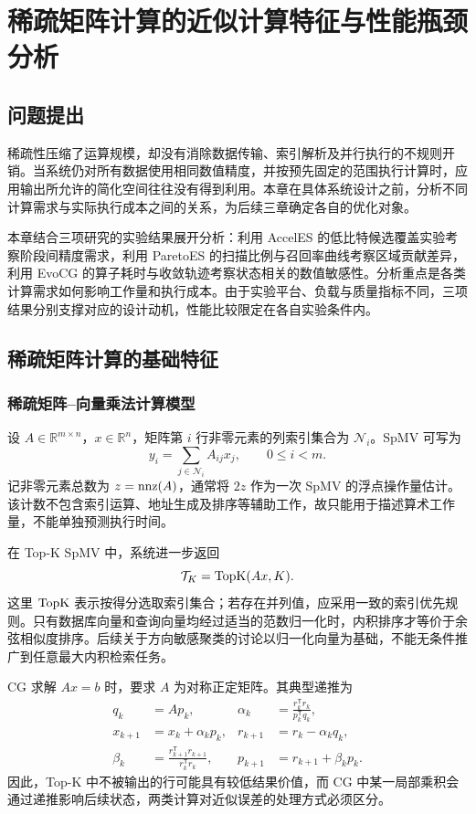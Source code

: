 \chapter{稀疏矩阵计算的近似计算特征与性能瓶颈分析}\label{chap:analysis}
\section{问题提出}
稀疏性压缩了运算规模，却没有消除数据传输、索引解析及并行执行的不规则开销。当系统仍对所有数据使用相同数值精度，并按预先固定的范围执行计算时，应用输出所允许的简化空间往往没有得到利用。本章在具体系统设计之前，分析不同计算需求与实际执行成本之间的关系，为后续三章确定各自的优化对象。

本章结合三项研究的实验结果展开分析：利用 AccelES 的低比特候选覆盖实验考察阶段间精度需求，利用 ParetoES 的扫描比例与召回率曲线考察区域贡献差异，利用 EvoCG 的算子耗时与收敛轨迹考察状态相关的数值敏感性。分析重点是各类计算需求如何影响工作量和执行成本。由于实验平台、负载与质量指标不同，三项结果分别支撑对应的设计动机，性能比较限定在各自实验条件内。

\section{稀疏矩阵计算的基础特征}
\subsection{稀疏矩阵--向量乘法计算模型}
设 $A\in\mathbb{R}^{m\times n}$，$x\in\mathbb{R}^{n}$，矩阵第 $i$ 行非零元素的列索引集合为 $\mathcal{N}_i$。SpMV 可写为
\begin{equation}
 y_i=\sum_{j\in\mathcal{N}_i} A_{ij}x_j,\qquad 0\leq i<m.
 \label{eq:spmv}
\end{equation}
记非零元素总数为 $z=\operatorname{nnz}(A)$，通常将 $2z$ 作为一次 SpMV 的浮点操作量估计。该计数不包含索引运算、地址生成及排序等辅助工作，故只能用于描述算术工作量，不能单独预测执行时间。

在 Top-K SpMV 中，系统进一步返回
\begin{equation}
 \mathcal{T}_K=\operatorname{TopK}(Ax,K).
\end{equation}
这里 $\operatorname{TopK}$ 表示按得分选取索引集合；若存在并列值，应采用一致的索引优先规则。只有数据库向量和查询向量均经过适当的范数归一化时，内积排序才等价于余弦相似度排序。后续关于方向敏感聚类的讨论以归一化向量为基础，不能无条件推广到任意最大内积检索任务。

CG 求解 $Ax=b$ 时，要求 $A$ 为对称正定矩阵。其典型递推为
\begin{align}
 q_k&=Ap_k,&\alpha_k&=\frac{r_k^{\mathsf T}r_k}{p_k^{\mathsf T}q_k},\\
 x_{k+1}&=x_k+\alpha_kp_k,&r_{k+1}&=r_k-\alpha_kq_k,\\
 \beta_k&=\frac{r_{k+1}^{\mathsf T}r_{k+1}}{r_k^{\mathsf T}r_k},&p_{k+1}&=r_{k+1}+\beta_kp_k.
 \label{eq:cg}
\end{align}
因此，Top-K 中不被输出的行可能具有较低结果价值，而 CG 中某一局部乘积会通过递推影响后续状态，两类计算对近似误差的处理方式必须区分。

